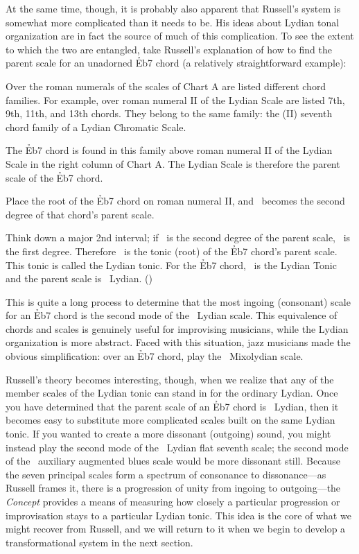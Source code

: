 At the same time, though, it is probably also apparent that Russell's system
is somewhat more complicated than it needs to be. His ideas about Lydian tonal
organization are in fact the source of much of this complication. To see the
extent to which the two are entangled, take Russell's explanation of
how to find the parent scale for an unadorned \h{Eb7} chord (a relatively
straightforward example):
%
\begin{quoting}
  \singlespacing
  Over the roman numerals of the scales of Chart A are listed different chord
  families. For example, over roman numeral II of the Lydian Scale are listed
  7th, 9th, 11th, and 13th chords. They belong to the same family: the (II)
  seventh chord family of a Lydian Chromatic Scale.

  The \h{Eb7} chord is found in this family above roman numeral II of the
  Lydian Scale in the right column of Chart A. The Lydian Scale is therefore
  the parent scale of the \h{Eb7} chord.

  Place the root of the \h{Eb7} chord on roman numeral II, and \Eflat\ becomes
  the second degree of that chord's parent scale.

  Think down a major 2nd interval; if \Eflat\ is the second degree of the
  parent scale, \Dflat\ is the first degree. Therefore \Dflat\ is the tonic
  (root) of the \h{Eb7} chord's parent scale. This tonic is called the Lydian
  tonic. For the \h{Eb7} chord, \Dflat\ is the Lydian Tonic and the parent
  scale is \Dflat\ Lydian. ()
\end{quoting}
%
\noindent This is quite a long process to determine that the most ingoing
(consonant) scale for an \h{Eb7} chord is the second mode of the \Dflat\
Lydian scale. This equivalence of chords and scales is genuinely useful for
improvising musicians, while the Lydian organization is more abstract. Faced
with this situation, jazz musicians made the obvious simplification: over an
\h{Eb7} chord, play the \Eflat\ Mixolydian scale.

Russell's theory becomes interesting, though, when we realize that any of the
member scales of the Lydian tonic can stand in for the ordinary Lydian. Once
you have determined that the parent scale of an \h{Eb7} chord is \Dflat\
Lydian, then it becomes easy to substitute more complicated scales built on
the same Lydian tonic. If you wanted to create a more dissonant (outgoing)
sound, you might instead play the second mode of the \Dflat\ Lydian flat
seventh scale; the second mode of the \Dflat\ auxiliary augmented blues scale
would be more dissonant still. Because the seven principal scales form a
spectrum of consonance to dissonance---as Russell frames it, there is a
progression of unity from ingoing to outgoing---the \emph{Concept} provides a
means of measuring how closely a particular progression or improvisation stays
to a particular Lydian tonic. This idea is the core of what we might recover
from Russell, and we will return to it when we begin to develop a
transformational system in the next section.

